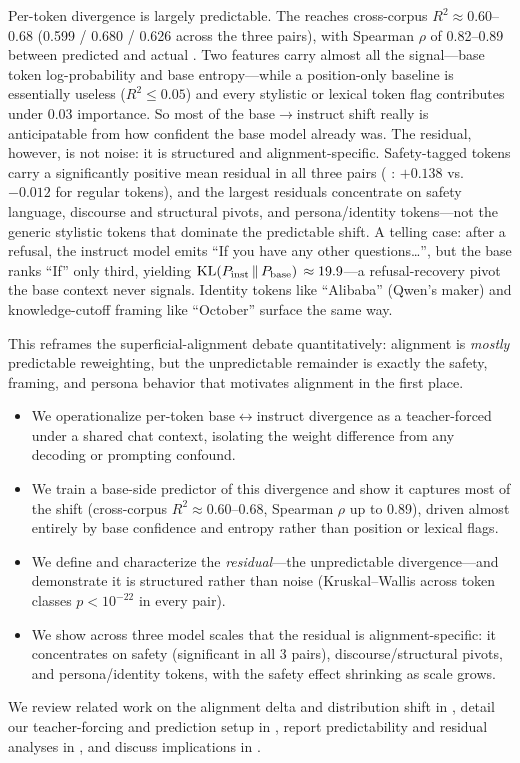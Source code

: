  Per-token divergence is largely predictable. The \gbt{} reaches cross-corpus \(R^2 \approx 0.60\)--\(0.68\) (0.599 / 0.680 / 0.626 across the three pairs), with Spearman \(\rho\) of 0.82--0.89 between predicted and actual \klt{}. Two features carry almost all the signal---base token log-probability and base entropy---while a position-only baseline is essentially useless (\(R^2 \leq 0.05\)) and every stylistic or lexical token flag contributes under 0.03 importance. So most of the base\(\to\)instruct shift really is anticipatable from how confident the base model already was. The residual, however, is not noise: it is structured and alignment-specific. Safety-tagged tokens carry a significantly positive mean residual in all three pairs (\eg{} \qwensmall{}: \(+0.138\) vs.\ \(-0.012\) for regular tokens), and the largest residuals concentrate on safety language, discourse and structural pivots, and persona/identity tokens---not the generic stylistic tokens that dominate the predictable shift. A telling case: after a refusal, the instruct model emits ``If you have any other questions\ldots'', but the base ranks ``If'' only third, yielding \(\mathrm{KL}\!\left(P_{\mathrm{inst}} \,\|\, P_{\mathrm{base}}\right){}\approx 19.9\)---a refusal-recovery pivot the base context never signals. Identity tokens like ``Alibaba'' (Qwen's maker) and knowledge-cutoff framing like ``October'' surface the same way.

This reframes the superficial-alignment debate quantitatively: alignment is \emph{mostly} predictable reweighting, but the unpredictable remainder is exactly the safety, framing, and persona behavior that motivates alignment in the first place.

\begin{itemize}[leftmargin=*,itemsep=0pt,topsep=0pt]
  \item We operationalize per-token base\(\leftrightarrow\)instruct divergence as a teacher-forced \klt{} under a shared chat context, isolating the weight difference from any decoding or prompting confound.
  \item We train a base-side \gbt{} predictor of this divergence and show it captures most of the shift (cross-corpus \(R^2 \approx 0.60\)--\(0.68\), Spearman \(\rho\) up to 0.89), driven almost entirely by base confidence and entropy rather than position or lexical flags.
  \item We define and characterize the \emph{residual}---the unpredictable divergence---and demonstrate it is structured rather than noise (Kruskal--Wallis across token classes \(p<10^{-22}\) in every pair).
  \item We show across three model scales that the residual is alignment-specific: it concentrates on safety (significant in all 3 pairs), discourse/structural pivots, and persona/identity tokens, with the safety effect shrinking as scale grows.
\end{itemize}

We review related work on the alignment delta and distribution shift in , detail our teacher-forcing and prediction setup in , report predictability and residual analyses in , and discuss implications in .

